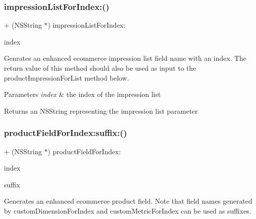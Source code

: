 \subsubsection{\texorpdfstring{impression\+List\+For\+Index\+:()}{impressionListForIndex:()}}
{\footnotesize\ttfamily + (N\+S\+String $\ast$) impression\+List\+For\+Index\+: \begin{DoxyParamCaption}\item[{(N\+S\+U\+Integer)}]{index }\end{DoxyParamCaption}}

Genrates an enhanced ecommerce impression list field name with an index. The return value of this method should also be used as input to the product\+Impression\+For\+List method below.


\begin{DoxyParams}{Parameters}
{\em index} & the index of the impression list\\
\hline
\end{DoxyParams}
\begin{DoxyReturn}{Returns}
an N\+S\+String representing the impression list parameter 
\end{DoxyReturn}
\mbox{\label{interface_g_a_i_ecommerce_fields_a09a834b91ffa68556617e00b2309c803}} 
\subsubsection{\texorpdfstring{product\+Field\+For\+Index\+:suffix\+:()}{productFieldForIndex:suffix:()}}
{\footnotesize\ttfamily + (N\+S\+String $\ast$) product\+Field\+For\+Index\+: \begin{DoxyParamCaption}\item[{(N\+S\+U\+Integer)}]{index }\item[{suffix:(N\+S\+String $\ast$)}]{suffix }\end{DoxyParamCaption}}

Generates an enhanced ecommerce product field. Note that field names generated by custom\+Dimension\+For\+Index and custom\+Metric\+For\+Index can be used as suffixes.


